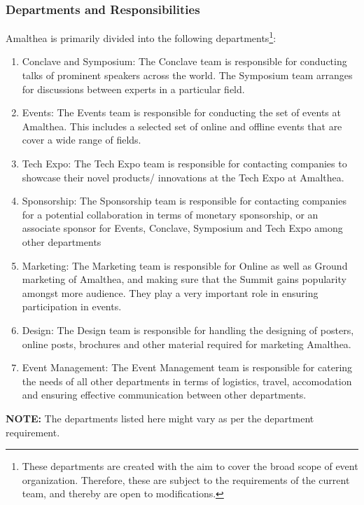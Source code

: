 \documentclass[12pt]{article}
\begin{document}
\subsubsection{Departments and Responsibilities}
Amalthea is primarily divided into the following departments\footnote{These departments are created with the aim to cover the broad scope of event organization. Therefore, these are subject to the requirements of the current team, and thereby are open to modifications.}:
\begin{enumerate}
    \item Conclave and Symposium: The Conclave team is responsible for conducting talks of prominent speakers across the world. The Symposium team arranges for discussions between experts in a particular field.
    \item Events: The Events team is responsible for conducting the set of events at Amalthea. This includes a selected set of online and offline events that are cover a wide range of fields.
    \item Tech Expo: The Tech Expo team is responsible for contacting companies to showcase their novel products/ innovations at the Tech Expo at Amalthea.
    \item Sponsorship: The Sponsorship team is responsible for contacting companies for a potential collaboration in terms of monetary sponsorship, or an associate sponsor for Events, Conclave, Symposium and Tech Expo among other departments
    \item Marketing: The Marketing team is responsible for Online as well as Ground marketing of Amalthea, and making sure that the Summit gains popularity amongst more audience. They play a very important role in ensuring participation in events.
    \item Design: The Design team is responsible for handling the designing of posters, online posts, brochures and other material required for marketing Amalthea.
    \item Event Management: The Event Management team is responsible for catering the needs of all other departments in terms of logistics, travel, accomodation and ensuring effective communication between other departments.
\end{enumerate}
\textbf{NOTE:} The departments listed here might vary as per the department requirement. 
\end{document}
